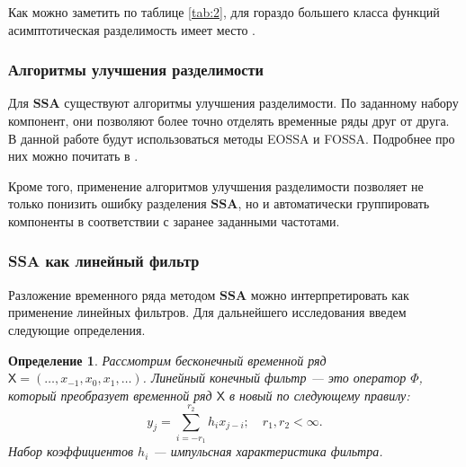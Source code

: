 \documentclass[a4paper, 11pt]{article}
\newcommand{\SSA}{\textbf{SSA}}
\newcommand{\TS}{\mathsf{X}}
\newtheorem{definition}{Определение} %
\begin{document}
Как можно заметить по таблице \ref{tab:2}, для гораздо большего класса функций асимптотическая разделимость имеет место \cite{golyandina2001analysis}.
\begin{table}[H]
	\begin{center}
		\caption{Асимптотическая разделимость}
		\label{tab:2}
	\end{center}
\end{table}

\subsubsection{Алгоритмы улучшения разделимости}
\label{sec:eossa_and_autogroup}
Для $\SSA$ существуют алгоритмы улучшения разделимости. По заданному набору компонент, они позволяют более точно отделять временные ряды друг от друга. В данной работе будут использоваться методы EOSSA и FOSSA. Подробнее про них можно почитать в \cite{golyandina2023intelligent}.

Кроме того, применение алгоритмов улучшения разделимости позволяет не только понизить ошибку разделения $\SSA$, но и автоматически группировать компоненты в соответствии с заранее заданными частотами.

\subsubsection{SSA как линейный фильтр}
Разложение временного ряда методом $\SSA$ можно интерпретировать как применение линейных фильтров. Для дальнейшего исследования введем следующие определения.

\begin{definition}
	Рассмотрим бесконечный временной ряд $\TS = (\dots, x_{-1}, x_0, x_1, \dots)$. Линейный конечный фильтр --- это оператор $\Phi$, который преобразует временной ряд $\TS$ в новый по следующему правилу:
	\begin{equation*}
		y_j = \sum \limits_{i = -r_1}^{r_2} h_i x_{j-i}; \quad r_1, r_2 < \infty.
	\end{equation*}
	Набор коэффициентов ${h_i}$ --- импульсная характеристика фильтра.
\end{definition}
\end{document}
